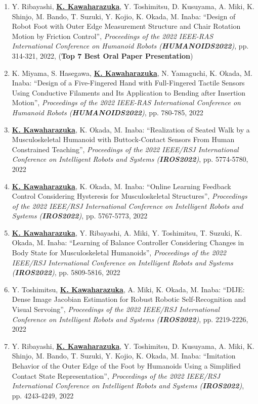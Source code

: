 \documentclass[letterpaper]{article}
\begin{document}
\begin{enumerate}
\item Y. Ribayashi, \underline{\textbf{K. Kawaharazuka}}, Y. Toshimitsu, D. Kusuyama, A. Miki, K. Shinjo, M. Bando, T. Suzuki, Y. Kojio, K. Okada, M. Inaba: ``Design of Robot Foot with Outer Edge Measurement Structure and Chair Rotation Motion by Friction Control'', \textit{Proceedings of the 2022 IEEE-RAS International Conference on Humanoid Robots (\textit{\textbf{HUMANOIDS2022}})}, pp. 314-321, 2022, (\textbf{Top 7 Best Oral Paper Presentation})
\item K. Miyama, S. Hasegawa, \underline{\textbf{K. Kawaharazuka}}, N. Yamaguchi, K. Okada, M. Inaba: ``Design of a Five-Fingered Hand with Full-Fingered Tactile Sensors Using Conductive Filaments and Its Application to Bending after Insertion Motion'', \textit{Proceedings of the 2022 IEEE-RAS International Conference on Humanoid Robots (\textit{\textbf{HUMANOIDS2022}})}, pp. 780-785, 2022
\item \underline{\textbf{K. Kawaharazuka}}, K. Okada, M. Inaba: ``Realization of Seated Walk by a Musculoskeletal Humanoid with Buttock-Contact Sensors From Human Constrained Teaching'', \textit{Proceedings of the 2022 IEEE/RSJ International Conference on Intelligent Robots and Systems (\textit{\textbf{IROS2022}})}, pp. 5774-5780, 2022
\item \underline{\textbf{K. Kawaharazuka}}, K. Okada, M. Inaba: ``Online Learning Feedback Control Considering Hysteresis for Musculoskeletal Structures'', \textit{Proceedings of the 2022 IEEE/RSJ International Conference on Intelligent Robots and Systems (\textit{\textbf{IROS2022}})}, pp. 5767-5773, 2022
\item \underline{\textbf{K. Kawaharazuka}}, Y. Ribayashi, A. Miki, Y. Toshimitsu, T. Suzuki, K. Okada, M. Inaba: ``Learning of Balance Controller Considering Changes in Body State for Musculoskeletal Humanoids'', \textit{Proceedings of the 2022 IEEE/RSJ International Conference on Intelligent Robots and Systems (\textit{\textbf{IROS2022}})}, pp. 5809-5816, 2022
\item Y. Toshimitsu, \underline{\textbf{K. Kawaharazuka}}, A. Miki, K. Okada, M. Inaba: ``DIJE: Dense Image Jacobian Estimation for Robust Robotic Self-Recognition and Visual Servoing'', \textit{Proceedings of the 2022 IEEE/RSJ International Conference on Intelligent Robots and Systems (\textit{\textbf{IROS2022}})}, pp. 2219-2226, 2022
\item Y. Ribayashi, \underline{\textbf{K. Kawaharazuka}}, Y. Toshimitsu, D. Kusuyama, A. Miki, K. Shinjo, M. Bando, T. Suzuki, Y. Kojio, K. Okada, M. Inaba: ``Imitation Behavior of the Outer Edge of the Foot by Humanoids Using a Simplified Contact State Representation'', \textit{Proceedings of the 2022 IEEE/RSJ International Conference on Intelligent Robots and Systems (\textit{\textbf{IROS2022}})}, pp. 4243-4249, 2022

\end{enumerate}
\end{document}
